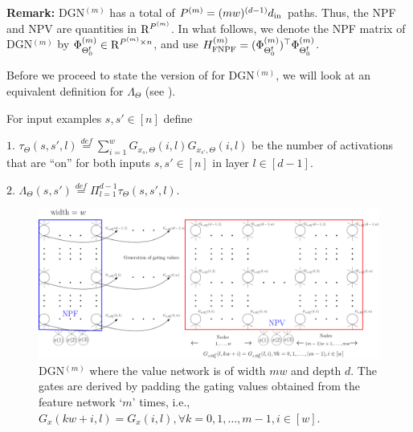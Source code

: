 \begin{appendix}
\textbf{Remark:}  DGN${}^{(m)}$ has a total of $P^{(m)}=(mw)^{(d-1)}d_{\text{in}}$ paths. Thus, the NPF and NPV are quantities in $\mathrm{R}^{P^{(m)}}$. In what follows, we denote the NPF matrix of DGN${}^{(m)}$ by $\Phi^{(m)}_{\Theta^{\textrm{f}}_0}\in\mathrm{R}^{P^{(m)}\times n}$, and use $H^{(m)}_{\text{FNPF}}=(\Phi^{(m)}_{\Theta^{\textrm{f}}_0})^\top \Phi^{(m)}_{\Theta^{\textrm{f}}_0}$. 

Before we proceed to state the version of  for DGN${}^{(m)}$, we will look at an equivalent definition for $\Lambda_{\Theta}$ (see ).
\begin{definition}\label{def:equilambda}
For input examples $s, s'\in[n]$ define 

$1.$ $\tau_{\Theta}(s,s',l)\stackrel{def}=\sum_{i=1}^w G_{x_s,\Theta}(i,l)G_{x_{s'},\Theta}(i,l)$ be the number of activations that are ``on'' for both inputs $s,s'\in[n]$ in layer $l\in[d-1]$.

$2.$ $\Lambda_{\Theta}(s,s')\stackrel{def}=\Pi_{l=1}^{d-1}\tau_{\Theta}(s,s',l)$.
\end{definition}

\FloatBarrier
\begin{figure}[h]
\centering
\includegraphics[scale=0.1]{figs/dgn-infty.png}
\caption{DGN${}^{(m)}$ where the value network is of width $mw$ and depth $d$. The gates are derived by padding the gating values obtained from the feature network `$m$' times, i.e., $ G_{x}(kw+i,l)=G_{x}(i,l),\forall k=0,1,\ldots,m-1, i\in[w]$.}
\label{fig:dgnpad}
\end{figure}




\end{appendix}
